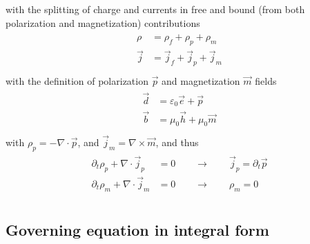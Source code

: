 \documentclass[letterpaper,10pt,english]{jupyterBook}
\begin{document}
\sphinxAtStartPar
with the splitting of charge and currents in free and bound (from both polarization and magnetization) contributions
\begin{equation*}
\begin{split}\begin{aligned}
  \rho    & =   \rho_f +   \rho_p +   \rho_m \\
  \vec{j} & =\vec{j}_f +\vec{j}_p +\vec{j}_m  \\
\end{aligned}\end{split}
\end{equation*}
\sphinxAtStartPar
with the definition of polarization \(\vec{p}\) and magnetization \(\vec{m}\) fields
\begin{equation*}
\begin{split}\begin{aligned}
  \vec{d} & = \varepsilon_0 \vec{e} + \vec{p} \\
  \vec{b} & = \mu_0 \vec{h} + \mu_0 \vec{m} \\
\end{aligned}\end{split}
\end{equation*}
\sphinxAtStartPar
with \(\rho_p = - \nabla \cdot \vec{p}\), and \(\vec{j}_m = \nabla \times \vec{m}\), and thus
\begin{equation*}
\begin{split}\begin{aligned}
  \partial_t \rho_p + \nabla \cdot \vec{j}_p & = 0 \qquad \rightarrow \qquad \vec{j}_p = \partial_t \vec{p} \\
  \partial_t \rho_m + \nabla \cdot \vec{j}_m & = 0 \qquad \rightarrow \qquad    \rho_m = 0                  \\
\end{aligned}\end{split}
\end{equation*}

\subsection{Governing equation in integral form}
\label{\detokenize{ch/principles-matter:governing-equation-in-integral-form}}\label{\detokenize{ch/principles-matter:classical-electromagnetism-media-integral}}
\end{document}

